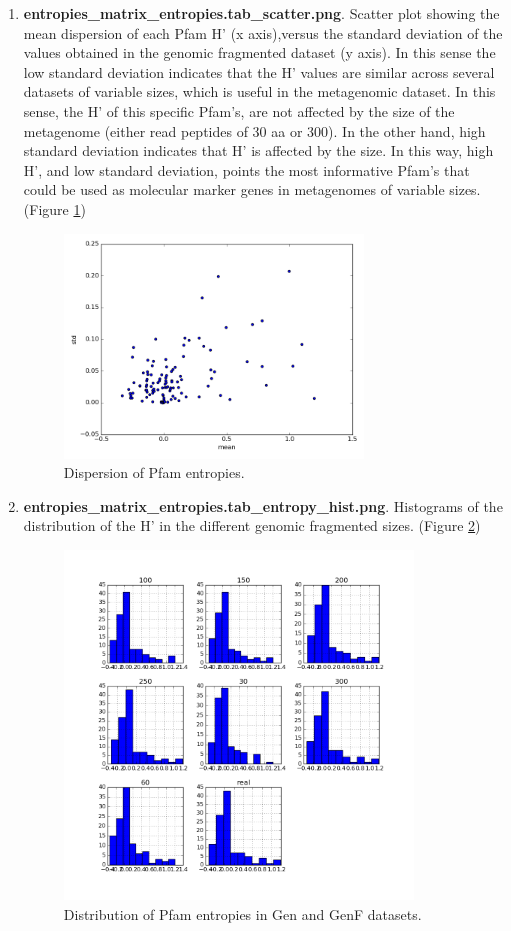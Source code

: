 \documentclass[12pt]{report}
\begin{document}
\begin{enumerate}
\begin{enumerate}
\item \textbf{entropies\_matrix\_entropies.tab\_scatter.png}. Scatter plot
showing the mean dispersion of each  Pfam H' (x axis),versus the standard
deviation of the values obtained in the genomic fragmented dataset (y axis). In
this sense the low standard deviation indicates that the H' values are similar
across several datasets of variable sizes, which is useful in the metagenomic
dataset. In this sense, the H' of this specific Pfam's, are not affected by the
size of the metagenome (either read peptides of 30 aa or 300). In the other
hand, high standard deviation indicates that H' is affected by the size. In
this way, high H', and low standard deviation, points the most informative
Pfam's that could be used as molecular marker genes in metagenomes of variable
sizes. (Figure \ref{fig:scatterplot}) 
 \begin{figure}[H]
  \centering
    \includegraphics[width=300px, scale =0.5]{entropies_matrix_entropies_tab_scatter.png}
    \caption{Dispersion of Pfam entropies.}
        \label{fig:scatterplot}
\end{figure}


\item \textbf{entropies\_matrix\_entropies.tab\_entropy\_hist.png}. Histograms
of the distribution of the H' in the different genomic fragmented sizes.
(Figure \ref{fig:histogram})

\begin{figure}[H]
  \centering
    \includegraphics[width=350px, scale =0.5]{entropies_matrix_entropies_tab_entropy_hist.png}
    \caption{Distribution of Pfam entropies in Gen and GenF datasets.}
        \label{fig:histogram}
\end{figure}


\end{enumerate}
\end{enumerate}
\end{document}
